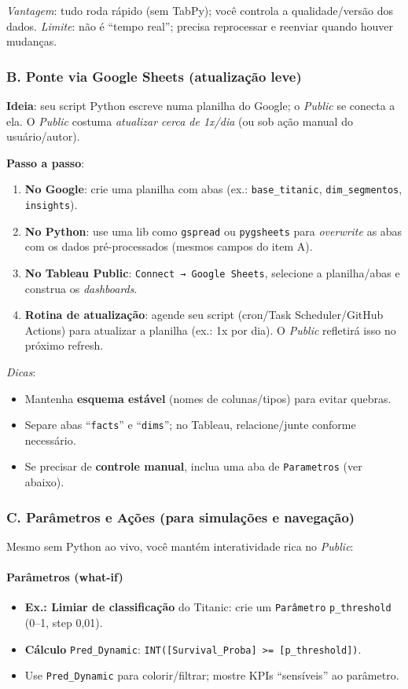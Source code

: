 \emph{Vantagem}: tudo roda rápido (sem TabPy); você controla a qualidade/versão dos dados.
\emph{Limite}: não é “tempo real”; precisa reprocessar e reenviar quando houver mudanças.

\subsubsection*{B. Ponte via Google Sheets (atualização leve)}
\textbf{Ideia}: seu script Python escreve numa planilha do Google; o \textit{Public} se conecta a ela. O \textit{Public} costuma \emph{atualizar cerca de 1x/dia} (ou sob ação manual do usuário/autor).

\textbf{Passo a passo}:
\begin{enumerate}[leftmargin=*]
\item \textbf{No Google}: crie uma planilha com abas (ex.: \texttt{base_titanic}, \texttt{dim_segmentos}, \texttt{insights}).
\item \textbf{No Python}: use uma lib como \texttt{gspread} ou \texttt{pygsheets} para \emph{overwrite} as abas com os dados pré-processados (mesmos campos do item A).
\item \textbf{No Tableau Public}: \texttt{Connect → Google Sheets}, selecione a planilha/abas e construa os \emph{dashboards}.
\item \textbf{Rotina de atualização}: agende seu script (cron/Task Scheduler/GitHub Actions) para atualizar a planilha (ex.: 1x por dia). O \textit{Public} refletirá isso no próximo refresh.
\end{enumerate}

\emph{Dicas}:
\begin{itemize}[leftmargin=*]
\item Mantenha \textbf{esquema estável} (nomes de colunas/tipos) para evitar quebras.
\item Separe abas “\texttt{facts}” e “\texttt{dims}”; no Tableau, relacione/junte conforme necessário.
\item Se precisar de \textbf{controle manual}, inclua uma aba de \texttt{Parametros} (ver abaixo).
\end{itemize}

\subsubsection*{C. Parâmetros e Ações (para simulações e navegação)}
Mesmo sem Python ao vivo, você mantém interatividade rica no \textit{Public}:

\paragraph{Parâmetros (what-if)}
\begin{itemize}[leftmargin=*]
\item \textbf{Ex.: Limiar de classificação} do Titanic: crie um \texttt{Parâmetro} \texttt{p_threshold} (0–1, step 0{,}01).
\item \textbf{Cálculo} \texttt{Pred_Dynamic}: \texttt{INT([Survival_Proba] >= [p_threshold])}.
\item Use \texttt{Pred_Dynamic} para colorir/filtrar; mostre KPIs “sensíveis” ao parâmetro.
\end{itemize}


